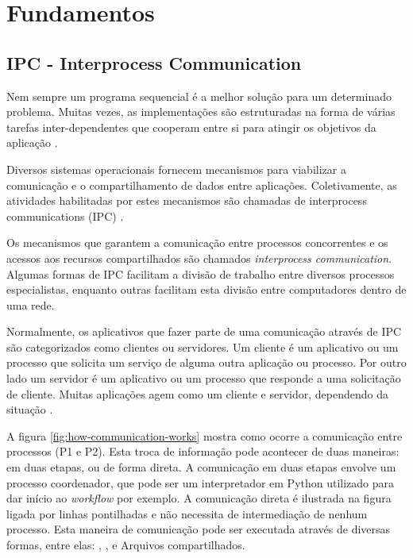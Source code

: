 \chapter[Fundamentos]{Fundamentos}

\section{IPC - Interprocess Communication}\label{sec:ipc}

Nem sempre um programa sequencial é a melhor solução para um determinado problema. Muitas vezes, as implementações são estruturadas na forma de várias tarefas inter-dependentes que cooperam 
entre si para atingir os objetivos da aplicação \cite{sistemas-op-mazierro}.

Diversos sistemas operacionais fornecem mecanismos para viabilizar a comunicação e o compartilhamento de dados entre aplicações. Coletivamente, as atividades habilitadas por estes mecanismos são chamadas de interprocess communications (IPC) \cite{microsoft-ipc}.

Os mecanismos que garantem a comunicação entre processos concorrentes e os acessos aos recursos compartilhados são chamados \textit{interprocess communication}. Algumas formas de IPC facilitam a divisão de trabalho entre diversos processos especialistas, enquanto outras facilitam esta divisão entre computadores dentro de uma rede.

Normalmente, os aplicativos que fazer parte de uma comunicação através de IPC são categorizados como clientes ou servidores. Um cliente é um aplicativo ou um processo que solicita um serviço de alguma outra aplicação ou processo. Por outro lado um servidor é um aplicativo ou um processo que responde a uma solicitação de cliente. Muitas aplicações agem como um cliente e servidor, dependendo da situação \cite{microsoft-ipc}.

A figura \ref{fig:how-communication-works} mostra como ocorre a comunicação entre processos (P1 e P2). Esta troca de informação pode acontecer de duas maneiras: em duas etapas, ou de forma direta. A comunicação em duas etapas envolve um processo coordenador, que pode ser um interpretador em Python utilizado para dar início ao \textit{workflow} por exemplo. A comunicação direta é ilustrada na figura ligada por linhas pontilhadas e não necessita de intermediação de nenhum processo. Esta maneira de comunicação pode ser executada através de diversas formas, entre elas: , ,  e Arquivos compartilhados.

